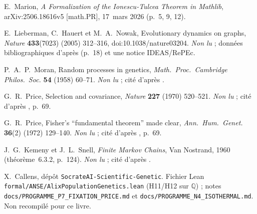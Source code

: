  E.~Marion, \emph{A Formalization of the Ionescu-Tulcea Theorem in Mathlib},
arXiv:2506.18616v5 [math.PR], 17~mars 2026 (p.~5, 9, 12).

 E.~Lieberman, C.~Hauert et M.~A.~Nowak, Evolutionary dynamics on graphs, \emph{Nature}
\textbf{433}(7023) (2005) 312--316, doi:10.1038/nature03204. \emph{Non lu} ; données bibliographiques d'après
\cite{ch4:KU} (p.~18) et une notice IDEAS/RePEc.

 P.~A.~P.~Moran, Random processes in genetics, \emph{Math.\ Proc.\ Cambridge Philos.\ Soc.}
\textbf{54} (1958) 60--71. \emph{Non lu} ; cité d'après \cite{ch4:KU}.

 G.~R.~Price, Selection and covariance, \emph{Nature} \textbf{227} (1970) 520--521.
\emph{Non lu} ; cité d'après \cite{ch4:LaG}, p.~69.

 G.~R.~Price, Fisher's ``fundamental theorem'' made clear, \emph{Ann.\ Hum.\ Genet.}
\textbf{36}(2) (1972) 129--140. \emph{Non lu} ; cité d'après \cite{ch4:LaG}, p.~69.

 J.~G.~Kemeny et J.~L.~Snell, \emph{Finite Markov Chains}, Van Nostrand, 1960 (théorème~6.3.2,
p.~124). \emph{Non lu} ; cité d'après \cite{ch4:PBRS}.

 X.~Callens, dépôt \texttt{SocrateAI-Scientific-Genetic}. Fichier Lean
\texttt{formal/ANSE/}\allowbreak\texttt{AlixPopulation}\allowbreak\texttt{Genetics.lean} (H11/H12 sur $\mathbb Q$) ;
notes \texttt{docs/}\allowbreak\texttt{PROGRAMME\_P7\_FIXATION\_PRICE.md} et
\texttt{docs/}\allowbreak\texttt{PROGRAMME\_N4\_ISOTHERMAL.md}. Non recompilé pour ce livre.
